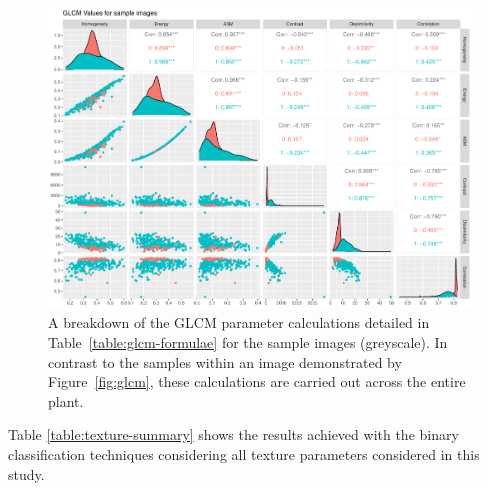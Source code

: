 \documentclass[letterpaper, notitlepage]{report}
\begin{document}
\begin{figure}[H]
	\centering
	\includegraphics[width=0.9\linewidth]{./figures/glcm-pairs.pdf}
	\caption[GLCM parameter correlation assessment]{A breakdown of the GLCM parameter calculations detailed in Table~\ref{table:glcm-formulae} for the sample images (greyscale). In contrast to the samples within an image demonstrated by Figure~\ref{fig:glcm}, these calculations are carried out across the entire plant. }
	\label{fig:glcm-ggpairs}
\end{figure} 

Table \ref{table:texture-summary} shows the results achieved with the binary classification techniques considering all texture parameters considered in this study.
\end{document}
